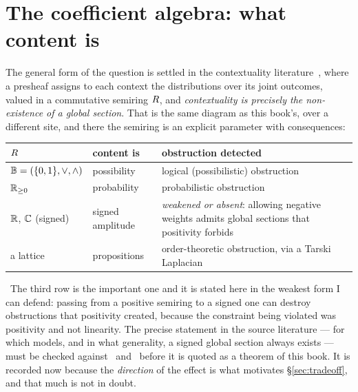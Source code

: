 \section{The coefficient algebra: what content is}\label{sec:coefficient}

The general form of the question is settled in the contextuality
literature~\cite{AbramskyBrandenburger}, where a presheaf assigns to each
context the distributions over its joint outcomes, valued in a commutative
semiring $R$, and \emph{contextuality is precisely the non-existence of a
global section}. That is the same diagram as this book's, over a different
site, and there the semiring is an explicit parameter with consequences:

\begin{center}
\begin{tabular}{@{}>{\raggedright\arraybackslash}p{}%
                  >{\raggedright\arraybackslash}p{}%
                  >{\raggedright\arraybackslash}p{}@{}}
\toprule
$R$ & content is & obstruction detected\\
\midrule
$\mathbb{B}=(\{0,1\},\vee,\wedge)$ & possibility &
  logical (possibilistic) obstruction\\
\addlinespace[2pt]
$\mathbb{R}_{\ge 0}$ & probability & probabilistic obstruction\\
\addlinespace[2pt]
$\mathbb{R}$, $\mathbb{C}$ (signed) & signed amplitude &
  \emph{weakened or absent}: allowing negative weights admits global sections
  that positivity forbids\\
\addlinespace[2pt]
a lattice & propositions &
  order-theoretic obstruction, via a Tarski Laplacian~\cite{GhristRiess}\\
\bottomrule
\end{tabular}
\end{center}

\begin{hon}\Hon
\Contested\ The third row is the important one and it is stated here in the
weakest form I can defend: passing from a positive semiring to a signed one
can destroy obstructions that positivity created, because the constraint being
violated was positivity and not linearity. The precise statement in the source
literature --- for which models, and in what generality, a signed global
section always exists --- must be checked against~\cite{AbramskyBrandenburger}
and~\cite{ABKLM} before it is quoted as a theorem of this book. It is recorded
now because the \emph{direction} of the effect is what motivates
\S\ref{sec:tradeoff}, and that much is not in doubt.
\end{hon}

